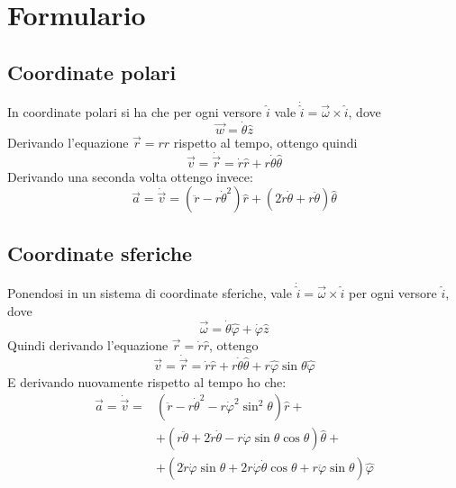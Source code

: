 \documentclass[../main.tex]{subfiles}
\begin{document}
\section{Formulario}
\setcounter{equation}{0}
\renewcommand{\theequation}{F.\arabic{equation}}
\subsection{Coordinate polari} 
In coordinate polari si ha che per ogni versore $\hat{i}$ vale $\dot{\hat{i}}=\overrightarrow{\omega}\times\hat{i}$,
dove
\begin{equation}\label{OmegaPolari}
	\overrightarrow{w}=\dot{\theta}\hat{z}
\end{equation}
Derivando l'equazione $\overrightarrow{r}=r\hat{r}$ rispetto al tempo, ottengo quindi
\begin{equation}\label{VelCooPolari}
	\overrightarrow{v}=\dot{\overrightarrow{r}}=\dot{r}\hat{r}+r\dot{\theta}\hat{\theta}
\end{equation}
Derivando una seconda volta ottengo invece:
\begin{equation}\label{AccCooPolari}
	\overrightarrow{a}=\dot{\overrightarrow{v}} =(\ddot{r}-r\dot{\theta}^2)\hat{r}+(2\dot{r}\dot{\theta}+r\ddot{\theta})\hat{\theta}
\end{equation}

\subsection{Coordinate sferiche}
Ponendosi in un sistema di coordinate sferiche, vale $\dot{\hat{i}}=\overrightarrow{\omega}\times\hat{i}$
per ogni versore $\hat{i}$, dove
\begin{equation}\label{OmegaSferiche}
	\overrightarrow{\omega}=\dot{\theta}\hat{\varphi}+\dot{\varphi}\hat{z}
\end{equation}
Quindi derivando l'equazione $\overrightarrow{r}=\dot{r}\hat{r}$, ottengo
\begin{equation}\label{VelCooSferiche}
	\overrightarrow{v} =\dot{\overrightarrow{r}}=\dot{r}\hat{r}+r\dot{\theta}\hat{\theta}+r\hat{\varphi}\sin{\theta}\hat{\varphi}
\end{equation}
E derivando nuovamente rispetto al tempo ho che:
\begin{equation}\label{AccCooSferiche}
\begin{split}
	\overrightarrow{a}=	\dot{\overrightarrow{v}}=	&\left(\ddot{r}-r\dot{\theta}^2-r\dot{\varphi}^2\sin^2\theta \right)\hat{r}+\\
													&	+\left( r\ddot{\theta}+2\dot{r}\dot{\theta}-r\dot{\varphi}\sin\theta\cos\theta \right)\hat{\theta}+\\
													&	+\left( 2\dot{r}\dot{\varphi}\sin\theta+2r\dot{\varphi}\dot{\theta}\cos\theta+r\ddot{\varphi}\sin\theta \right)\hat{\varphi}
\end{split}
\end{equation}
\end{document}
